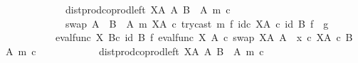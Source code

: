 \begin{isabellebody}
\ \ \ \ \ \ \ \ \ \ \ \ dist{\isacharunderscore}{\kern0pt}prod{\isacharunderscore}{\kern0pt}coprod{\isacharunderscore}{\kern0pt}left\ {\isacharparenleft}{\kern0pt}X\isactrlbsup A\isactrlesup {\isacharparenright}{\kern0pt}\ A\ {\isacharparenleft}{\kern0pt}B\ {\isasymsetminus}\ {\isacharparenleft}{\kern0pt}A{\isacharcomma}{\kern0pt}\ m{\isacharparenright}{\kern0pt}{\isacharparenright}{\kern0pt}\ {\isasymcirc}\isactrlsub c\isanewline
\ \ \ \ \ \ \ \ \ \ \ \ swap\ {\isacharparenleft}{\kern0pt}A\ {\isasymCoprod}\ {\isacharparenleft}{\kern0pt}B\ {\isasymsetminus}\ {\isacharparenleft}{\kern0pt}A{\isacharcomma}{\kern0pt}\ m{\isacharparenright}{\kern0pt}{\isacharparenright}{\kern0pt}{\isacharparenright}{\kern0pt}\ {\isacharparenleft}{\kern0pt}X\isactrlbsup A\isactrlesup {\isacharparenright}{\kern0pt}\ {\isasymcirc}\isactrlsub c\ try{\isacharunderscore}{\kern0pt}cast\ m\ {\isasymtimes}\isactrlsub f\ id\isactrlsub c\ {\isacharparenleft}{\kern0pt}X\isactrlbsup A\isactrlesup {\isacharparenright}{\kern0pt}{\isacharparenright}{\kern0pt}\isactrlsup {\isasymsharp}{\isacharparenright}{\kern0pt}{\isacharparenright}{\kern0pt}{\isacharparenright}{\kern0pt}\ {\isasymcirc}\isactrlsub c\ {\isacharparenleft}{\kern0pt}id\ B\ {\isasymtimes}\isactrlsub f\ \ g{\isacharparenright}{\kern0pt}\ {\isacharequal}{\kern0pt}\ \isanewline
\ \ \ \ \ \ \ \ \ \ {\isacharparenleft}{\kern0pt}{\isacharparenleft}{\kern0pt}eval{\isacharunderscore}{\kern0pt}func\ X\ B{\isacharparenright}{\kern0pt}{\isasymcirc}\isactrlsub c\ {\isacharparenleft}{\kern0pt}id\ B\ {\isasymtimes}\isactrlsub f\ {\isacharparenleft}{\kern0pt}{\isacharparenleft}{\kern0pt}{\isacharparenleft}{\kern0pt}eval{\isacharunderscore}{\kern0pt}func\ X\ A\ {\isasymcirc}\isactrlsub c\ swap\ {\isacharparenleft}{\kern0pt}X\isactrlbsup A\isactrlesup {\isacharparenright}{\kern0pt}\ A{\isacharparenright}{\kern0pt}\ {\isasymamalg}\ {\isacharparenleft}{\kern0pt}x\ {\isasymcirc}\isactrlsub c\ {\isasymbeta}\isactrlbsub X\isactrlbsup A\isactrlesup \ {\isasymtimes}\isactrlsub c\ {\isacharparenleft}{\kern0pt}B\ {\isasymsetminus}\ {\isacharparenleft}{\kern0pt}A{\isacharcomma}{\kern0pt}\ m{\isacharparenright}{\kern0pt}{\isacharparenright}{\kern0pt}\isactrlesub {\isacharparenright}{\kern0pt}\ {\isasymcirc}\isactrlsub c\isanewline
\ \ \ \ \ \ \ \ \ \ \ \ dist{\isacharunderscore}{\kern0pt}prod{\isacharunderscore}{\kern0pt}coprod{\isacharunderscore}{\kern0pt}left\ {\isacharparenleft}{\kern0pt}X\isactrlbsup A\isactrlesup {\isacharparenright}{\kern0pt}\ A\ {\isacharparenleft}{\kern0pt}B\ {\isasymsetminus}\ {\isacharparenleft}{\kern0pt}A{\isacharcomma}{\kern0pt}\ m{\isacharparenright}{\kern0pt}{\isacharparenright}{\kern0pt}\ {\isasymcirc}\isactrlsub c\isanewline

\end{isabellebody}
